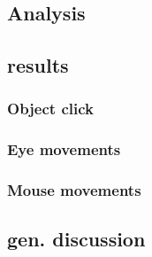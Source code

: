 \documentclass[a4paper,man,natbib]{apa6}
\begin{document}
\subsection{Analysis}

\subsection{results}
\subsubsection{Object click}
\subsubsection{Eye movements}
\subsubsection{Mouse movements}

\subsection{gen. discussion}
\end{document}
